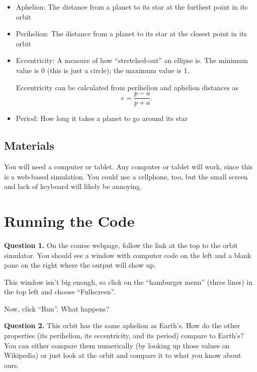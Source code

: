 \documentclass[11pt]{article}
\begin{document}
\begin{itemize}
	\item Aphelion: The distance from a planet to its star at the furthest point in its orbit
	\item Perihelion: The distance from a planet to its star at the closest point in its orbit
	\item Eccentricity: A measure of how ``stretched-out'' an ellipse is. The minimum value is 0 (this is just a circle); the maximum value is 1.
	
	Eccentricity can be calculated from perihelion and aphelion distances as $$e=\frac{p-a}{p+a}.$$
	
	\item Period: How long it takes a planet to go around its star
\end{itemize}

\subsection*{Materials} 

You will need a computer or tablet. Any computer or tablet will work, since this is a web-based simulation. You could use a cellphone, too, but 
the small screen and lack of keyboard will likely be annoying.

\newpage

\section{Running the Code}

\textbf{Question 1.} On the course webpage, follow the link at the top to the orbit simulator. You should see a window with computer code on the left
and a blank pane on the right where the output will show up.

This window isn't big enough, so click on the ``hamburger menu'' (three lines) in the top left and choose ``Fullscreen''.

Now, click ``Run''. What happens?

\vspace*{1.5cm}
\hrulefill

\textbf{Question 2.} This orbit has the same aphelion as Earth's. How do the other properties (its perihelion, its eccentricity, and its period) compare to Earth's? 
You can either compare them numerically (by looking up those values on Wikipedia) or just look at the orbit and compare it to what you know about ours.

\vspace*{2.5cm}
\hrulefill\\
\end{document}
